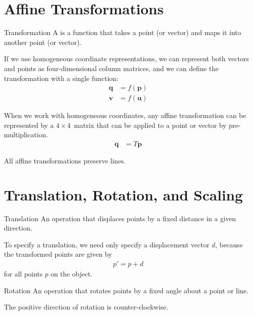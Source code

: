 \documentclass[../COS3712_Notes.tex]{subfiles}
\begin{document}
    \section{Affine Transformations}
      \begin{definition}{Transformation}
        A  is a function that takes a point (or vector)
        and maps it into another point (or vector).
      \end{definition}

      If we use homogeneous coordinate representations, we can represent both vectors and points
      as four-dimensional column matrices, and we can define the transformation with a single
      function:
      \begin{align*}
        \mathbf{q} &= f(\mathbf{p})\\
        \mathbf{v} &= f(\mathbf{u})
      \end{align*}

      When we work with homogeneous coordinates, any affine transformation can be represented
      by a $4 \times 4$~matrix that can be applied to a point or vector by pre-multiplication.
      \begin{align*}
        \mathbf{q} &= T\mathbf{p}
      \end{align*}

      All affine transformations preserve lines.

    \section{Translation, Rotation, and Scaling}
      \begin{definition}{Translation}
        An operation that displaces points by a fixed distance in a given direction.

        To specify a translation, we need only specify a displacement vector $d$,
        because the transformed points are given by
        \begin{align*}
          p' = p + d
        \end{align*}
        for all points $p$ on the object.
      \end{definition}

      \begin{definition}{Rotation}
        An operation that rotates points by a fixed angle about a point or line.

        The positive direction of rotation is counter-clockwise.
      \end{definition}
\end{document}
